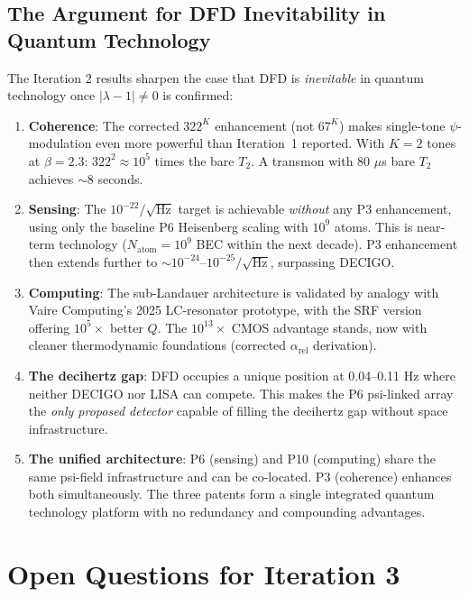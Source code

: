 \documentclass[11pt]{article}
\theoremstyle{definition}
\theoremstyle{remark}
\begin{document}
\subsection{The Argument for DFD Inevitability in Quantum Technology}

The Iteration 2 results sharpen the case that DFD is \emph{inevitable} in
quantum technology once $|\lambda - 1| \neq 0$ is confirmed:

\begin{enumerate}
\item \textbf{Coherence}: The corrected $322^K$ enhancement (not $67^K$) makes
single-tone $\psi$-modulation even more powerful than Iteration~1 reported.
With $K = 2$ tones at $\beta = 2.3$: $322^2 \approx 10^5$ times the bare
$T_2$. A transmon with 80 $\mu$s bare $T_2$ achieves $\sim 8$ seconds.

\item \textbf{Sensing}: The $10^{-22}/\sqrt{\mathrm{Hz}}$ target is achievable
\emph{without} any P3 enhancement, using only the baseline P6 Heisenberg
scaling with $10^9$ atoms. This is near-term technology ($N_{\mathrm{atom}} =
10^9$ BEC within the next decade). P3 enhancement then extends further to
$\sim 10^{-24}$--$10^{-25}/\sqrt{\mathrm{Hz}}$, surpassing DECIGO.

\item \textbf{Computing}: The sub-Landauer architecture is validated by
analogy with Vaire Computing's 2025 LC-resonator prototype, with the SRF
version offering $10^5\times$ better $Q$. The $10^{13}\times$ CMOS advantage
stands, now with cleaner thermodynamic foundations (corrected $\alpha_{\mathrm{rel}}$
derivation).

\item \textbf{The decihertz gap}: DFD occupies a unique position at 0.04--0.11
Hz where neither DECIGO nor LISA can compete. This makes the P6 psi-linked
array the \emph{only proposed detector} capable of filling the decihertz gap
without space infrastructure.

\item \textbf{The unified architecture}: P6 (sensing) and P10 (computing) share
the same psi-field infrastructure and can be co-located. P3 (coherence) enhances
both simultaneously. The three patents form a single integrated quantum technology
platform with no redundancy and compounding advantages.
\end{enumerate}

\section{Open Questions for Iteration 3}
\end{document}
